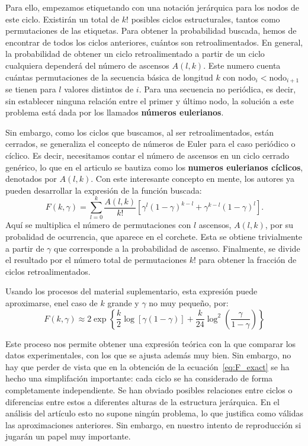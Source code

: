 \documentclass[1p]{elsarticle}
\begin{document}
    Para ello, empezamos etiquetando con una notación jerárquica para los nodos de este ciclo. 
    Existirán un total de $k!$ posibles ciclos estructurales, tantos como permutaciones de las etiquetas. 
    Para obtener la probabilidad buscada, hemos de encontrar de todos los ciclos anteriores, cuántos son retroalimentados.
    En general, la probabilidad de obtener un ciclo retroalimentado a partir de un ciclo cualquiera dependerá del número de ascensos $A(l,k)$.
    Este numero cuenta cuántas permutaciones de la secuencia básica de longitud $k$ con $\textrm{nodo}_{i} < \textrm{nodo}_{i+1}$ se tienen para $l$ valores distintos de $i$. Para una secuencia no periódica, es decir, sin establecer ninguna relación entre el primer y último nodo, la solución a este problema está dada por los llamados \textbf{números eulerianos}.

    Sin embargo, como los ciclos que buscamos, al ser retroalimentados, están cerrados, se  generaliza el concepto de números de Euler para el caso periódico o cíclico.
    Es decir, necesitamos contar el número de ascensos en un ciclo cerrado genérico, lo que en el articulo se bautiza como los \textbf{numeros eulerianos cíclicos}, denotados por $A(l,k)$.
Con este interesante concepto en mente, los autores ya pueden desarrollar la expresión de la función buscada: %
    \begin{equation}
    \label{eq:F_exact}
        F(k,\gamma)=\sum_{l=0}^{k}\frac{A(l,k)}{k!}[\gamma^l(1-\gamma)^{k-l}+\gamma^{k-l}(1-\gamma)^l]
    .
    \end{equation}
Aquí se multiplica el número de permutaciones con $l$ ascensos, $A(l,k)$, por su probalidad de ocurrencia, que aparece en el corchete.
Esta se obtiene trivialmente a partir de $\gamma$ que corresponde a la probabilidad de ascenso. Finalmente, se divide el resultado por el número total de permutaciones $k!$ para obtener la fracción de ciclos retroalimentados.

Usando los procesos del material suplementario, esta expresión puede aproximarse, enel caso de $k$ grande y $\gamma$ no muy pequeño, por:
\begin{equation}
    \label{eq:F_asymp}
    F(k,\gamma)
    \approx 
    2\exp\left\{\frac{k}{2}\log[\gamma(1-\gamma)]+\frac{k}{24} \log^2(\frac{\gamma}{1-\gamma})\right\}
\end{equation}

    Este proceso nos permite obtener una expresión teórica con la que comparar los datos experimentales, con los que se ajusta además muy bien.
    Sin embargo, no hay que perder de vista que en la obtención de la ecuación~\ref{eq:F_exact} se ha hecho una simplifación importante: cada ciclo se ha considerado de forma completamente independiente. 
    Se han obviado posibles relaciones entre ciclos o diferencias entre estos a diferentes alturas de la estructura jerárquica.
    En el análisis del artículo esto no supone ningún problema, lo que justifica como válidas las aproximaciones anteriores.
    Sin embargo, en nuestro intento de reproducción si jugarán un papel muy importante.
\end{document}

